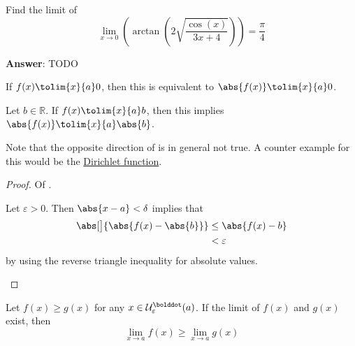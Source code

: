 \begin{exm}
    Find the limit of
    \begin{equation*}
        \lim_{x \to 0}\left(\arctan\left(2\sqrt{\frac{\cos(x)}{3x+4}}\right)\right)=\frac{\pi}{4}
    \end{equation*}
    \begin{flushleft}
        \textbf{Answer}: TODO
    \end{flushleft}
\end{exm}

\begin{thm}\label{thm-absolute-value-of-limit:1}
    If $f(x) \tolim{x}{a} 0$, then this is equivalent to
    $\abs{f(x)} \tolim{x}{a} 0$.
\end{thm}

\begin{thm}\label{thm-absolute-value-of-limit:2}
    Let $b\in\mathbb{R}$. If $f(x) \tolim{x}{a} b$, then 
    this implies $\abs{f(x)} \tolim{x}{a} \abs{b}$.
\end{thm}

\begin{rem}
    Note that the opposite direction of 
    is in general not true. A counter example for this would be the 
    \hyperref[def-dirichlet-function]{Dirichlet function}.
\end{rem}

\begin{proof}
    Of .
    \begin{flushleft}
        Let $\varepsilon>0$. Then $\abs{x-a}<\delta$ implies that
        \begin{align*}
            \abs[\big]{\abs{f(x) - \abs{b}}} &\leq \abs{f(x) - b} \\
                                             &<\varepsilon
        \end{align*}
        by using the reverse triangle inequality for absolute values.
    \end{flushleft}
\end{proof}

\begin{thm}\label{thm-limit-monotonicity}
    Let $f(x) \geq g(x)$ for any $x\in\mathcal{U}_{\varepsilon}^{\bolddot}(a)$. 
    If the limit of $f(x)$ and $g(x)$ exist, then
    \begin{equation*}
        \lim_{x \to a}f(x) \geq \lim_{x \to a}g(x)
    \end{equation*}
\end{thm}

